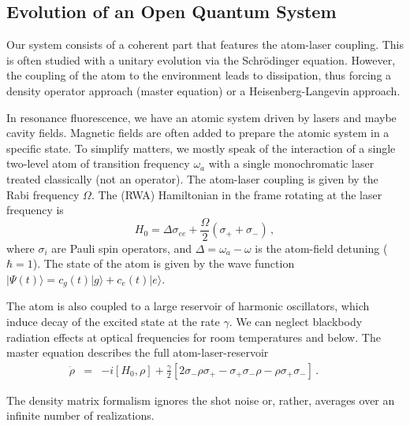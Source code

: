 \documentclass[twocolumn,aps,eqsecnum,showkeys,amsmath]{revtex4}
\providecommand{\ket}[1]{\lvert #1 \rangle}
\begin{document}
\subsection{Evolution of an Open Quantum System} 
Our system consists of a coherent part that features the atom-laser 
coupling. This is often studied with a unitary evolution via the 
Schr\"odinger equation. However, the coupling of the atom to the 
environment leads to dissipation, thus forcing a density operator 
approach (master equation) or a Heisenberg-Langevin approach. 

In resonance fluorescence, we have an atomic system driven by lasers 
and maybe cavity fields. Magnetic fields are often added to prepare 
the atomic system in a specific state. To simplify matters, we mostly speak 
of the interaction of a single two-level atom of transition frequency 
$\omega_a$ with a single monochromatic laser treated classically (not an 
operator). The atom-laser coupling is given by the Rabi frequency 
$\Omega$. The (RWA) Hamiltonian in the frame rotating at the laser 
frequency is 
%
\begin{equation}
H_0 = \Delta \sigma_{ee} +\frac{\Omega}{2}(\sigma_+  +\sigma_-)  \,,
\end{equation}
where $\sigma_i$ are Pauli spin operators, and 
$\Delta= \omega_a -\omega$ is the atom-field detuning ($\hbar=1$). 
The state of the atom is given by the wave function 
$\ket{\Psi (t)} = c_g(t) \ket{g} +c_e(t) \ket{e}$. 

The atom is also coupled to a large reservoir of harmonic oscillators,  
which induce decay of the excited state at the rate $\gamma$. We can 
neglect blackbody radiation effects at optical frequencies for room 
temperatures and below. The master equation describes the full 
atom-laser-reservoir 
%
\begin{eqnarray} 	\label{MasterEq}
\dot{\rho} &=& - i [H_0,\rho] +\frac{\gamma}{2} \left[ 2 \sigma_- \rho \sigma_+ 
	-\sigma_+ \sigma_- \rho - \rho  \sigma_+ \sigma_- \right]  	\,. 	\qquad	
\end{eqnarray}

The density matrix formalism ignores the shot noise or, rather, averages 
over an infinite number of realizations.

\end{document}
